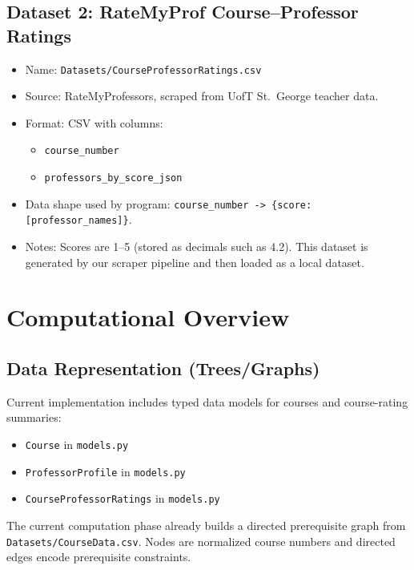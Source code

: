 \documentclass[12pt]{article}
\begin{document}
\subsection{Dataset 2: RateMyProf Course--Professor Ratings}
\begin{itemize}[leftmargin=*]
    \item Name: \texttt{Datasets/CourseProfessorRatings.csv}
    \item Source: RateMyProfessors, scraped from UofT St.\ George teacher data.
    \item Format: CSV with columns:
    \begin{itemize}[leftmargin=*]
        \item \texttt{course\_number}
        \item \texttt{professors\_by\_score\_json}
    \end{itemize}
    \item Data shape used by program: \texttt{course\_number -> \{score: [professor\_names]\}}.
    \item Notes: Scores are 1--5 (stored as decimals such as 4.2). This dataset is generated by our scraper pipeline and then loaded as a local dataset.
\end{itemize}

\section{Computational Overview}
\subsection{Data Representation (Trees/Graphs)}
Current implementation includes typed data models for courses and course-rating summaries:
\begin{itemize}[leftmargin=*]
    \item \texttt{Course} in \texttt{models.py}
    \item \texttt{ProfessorProfile} in \texttt{models.py}
    \item \texttt{CourseProfessorRatings} in \texttt{models.py}
\end{itemize}
The current computation phase already builds a directed prerequisite graph from \texttt{Datasets/CourseData.csv}. Nodes are normalized course numbers and directed edges encode prerequisite constraints.
\end{document}
